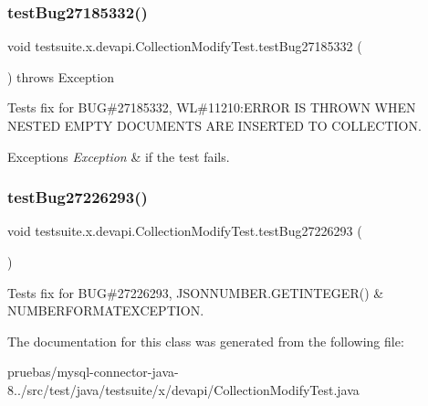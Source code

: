 \subsubsection{\texorpdfstring{test\+Bug27185332()}{testBug27185332()}}
{\footnotesize\ttfamily void testsuite.\+x.\+devapi.\+Collection\+Modify\+Test.\+test\+Bug27185332 (\begin{DoxyParamCaption}{ }\end{DoxyParamCaption}) throws Exception}

Tests fix for B\+UG\#27185332, WL\#11210\+:E\+R\+R\+OR IS T\+H\+R\+O\+WN W\+H\+EN N\+E\+S\+T\+ED E\+M\+P\+TY D\+O\+C\+U\+M\+E\+N\+TS A\+RE I\+N\+S\+E\+R\+T\+ED TO C\+O\+L\+L\+E\+C\+T\+I\+ON.


\begin{DoxyExceptions}{Exceptions}
{\em Exception} & if the test fails. \\
\hline
\end{DoxyExceptions}
\mbox{\label{classtestsuite_1_1x_1_1devapi_1_1_collection_modify_test_a6d0ae2734e78f28c26e4fdcf1e8d4235}} 
\subsubsection{\texorpdfstring{test\+Bug27226293()}{testBug27226293()}}
{\footnotesize\ttfamily void testsuite.\+x.\+devapi.\+Collection\+Modify\+Test.\+test\+Bug27226293 (\begin{DoxyParamCaption}{ }\end{DoxyParamCaption})}

Tests fix for B\+UG\#27226293, J\+S\+O\+N\+N\+U\+M\+B\+E\+R.\+G\+E\+T\+I\+N\+T\+E\+G\+E\+R() \& N\+U\+M\+B\+E\+R\+F\+O\+R\+M\+A\+T\+E\+X\+C\+E\+P\+T\+I\+ON. 

The documentation for this class was generated from the following file\+:\begin{DoxyCompactItemize}
\item 
pruebas/mysql-\/connector-\/java-\/8../src/test/java/testsuite/x/devapi/Collection\+Modify\+Test.\+java\end{DoxyCompactItemize}
